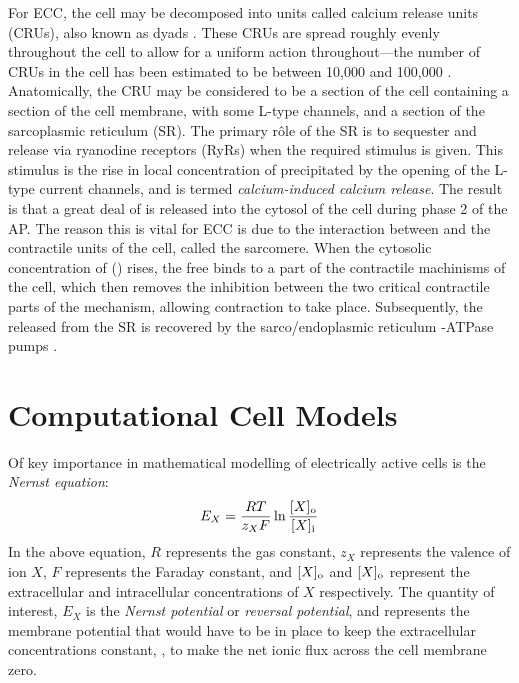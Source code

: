 \documentclass[../thesis-main.tex]{subfiles}
\begin{document}
 For ECC, the cell may be decomposed into units called calcium release units (CRUs), also known as dyads \citep{Cleemann1998}. These CRUs are spread roughly evenly throughout the cell to allow for a uniform action throughout---the number of CRUs in the cell has been estimated to be between 10,000 and 100,000 \citep{Cleemann1998,Greenstein2002}. Anatomically, the CRU may be considered to be a section of the cell containing a section of the cell membrane, with some L-type \ca{} channels, and a section of the sarcoplasmic reticulum (SR). The primary r\^ole of the SR is to sequester and release \ca{} via ryanodine receptors (RyRs) when the required stimulus is given. This stimulus is the rise in local concentration of \ca{} precipitated by the opening of the L-type \ca{} current channels, and is termed \emph{calcium-induced calcium release}. The result is that a great deal of \ca{} is released into the cytosol of the cell during phase 2 of the AP. The reason this is vital for ECC is due to the interaction between \ca{} and the contractile units of the cell, called the sarcomere. When the cytosolic concentration of \ca{} (\cai{}) rises, the free \ca{} binds to a part of the contractile machinisms of the cell, which then removes the inhibition between the two critical contractile parts of the mechanism, allowing contraction to take place. Subsequently, the \ca{} released from the SR is recovered by the sarco/endoplasmic reticulum \ca{}-ATPase pumps \citep{Franzini-Armstrong2005}.
 
 \section{Computational Cell Models}
 \label{sec:cell-models}
 
 
 Of key importance in mathematical modelling of electrically active cells is the \emph{Nernst equation}:
 \begin{equation}
  E_X = \frac{RT}{z_XF}\ln\frac{[X]_\textnormal{o}}{[X]_\textnormal{i}}
 \end{equation}
 In the above equation, $R$ represents the gas constant, $z_X$ represents the valence of ion $X$, $F$ represents the Faraday constant, and $[X]_\textnormal{o}$ and $[X]_\textnormal{o}$ represent the extracellular and intracellular concentrations of $X$ respectively. The quantity of interest, $E_X$ is the \emph{Nernst potential} or \emph{reversal potential}, and represents the membrane potential that would have to be in place to keep the extracellular concentrations constant, \idest, to make the net ionic flux across the cell membrane zero.
 
\end{document}
